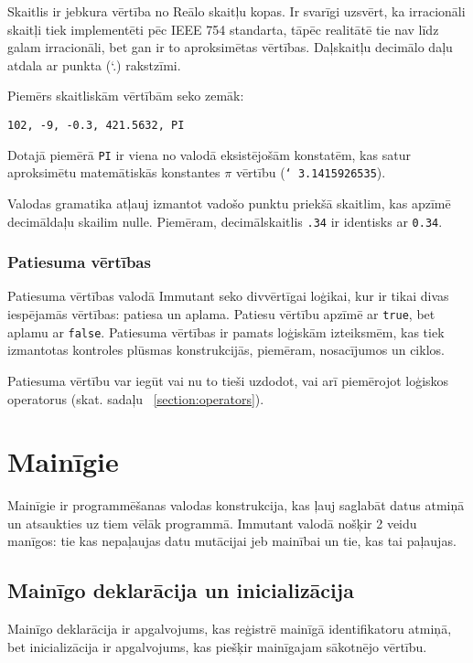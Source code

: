 \documentclass[12pt,a4paper]{report}
\begin{document}
Skaitlis ir jebkura vērtība no Reālo skaitļu kopas. Ir svarīgi uzsvērt, ka irracionāli skaitļi tiek implementēti pēc IEEE 754 standarta, tāpēc realitātē tie nav līdz galam irracionāli, bet gan ir to aproksimētas vērtības. Daļskaitļu decimālo daļu atdala ar punkta (\char`.) rakstzīmi.

Piemērs skaitliskām vērtībām seko zemāk:

\begin{verbatim}
102, -9, -0.3, 421.5632, PI
\end{verbatim}

Dotajā piemērā \texttt{PI} ir viena no valodā eksistējošām konstatēm, kas satur aproksimētu matemātiskās konstantes $\pi$ vērtību (\texttt{\char`~3.1415926535}).

Valodas gramatika atļauj izmantot vadošo punktu priekšā skaitlim, kas apzīmē decimāldaļu skailim nulle. Piemēram, decimālskaitlis \texttt{.34} ir identisks ar \texttt{0.34}.


\subsubsection{Patiesuma vērtības}

Patiesuma vērtības valodā Immutant seko divvērtīgai loģikai, kur ir tikai divas iespējamās vērtības: patiesa un aplama. Patiesu vērtību apzīmē ar \texttt{true}, bet aplamu ar \texttt{false}. Patiesuma vērtības ir pamats loģiskām izteiksmēm, kas tiek izmantotas kontroles plūsmas konstrukcijās, piemēram, nosacījumos un ciklos. 

Patiesuma vērtību var iegūt vai nu to tieši uzdodot, vai arī piemērojot loģiskos operatorus (skat. sadaļu ~\ref{section:operators}).

\section{Mainīgie}
\label{section:vars}

Mainīgie ir programmēšanas valodas konstrukcija, kas ļauj saglabāt datus atmiņā un atsaukties uz tiem vēlāk programmā. Immutant valodā nošķir 2 veidu manīgos: tie kas nepaļaujas datu mutācijai jeb mainībai un tie, kas tai paļaujas. 

\subsection{Mainīgo deklarācija un inicializācija}

Mainīgo deklarācija ir apgalvojums, kas reģistrē mainīgā identifikatoru atmiņā, bet inicializācija ir apgalvojums, kas piešķir mainīgajam sākotnējo vērtību.
\end{document}
